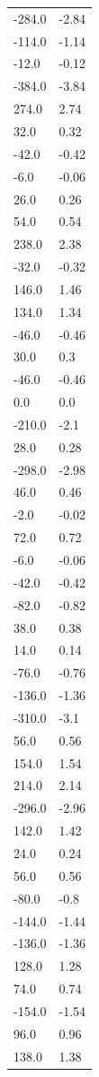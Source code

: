 \begin{longtable}{ll}
-284.0 & -2.84 \\
-114.0 & -1.14 \\
-12.0 & -0.12 \\
-384.0 & -3.84 \\
274.0 & 2.74 \\
32.0 & 0.32 \\
-42.0 & -0.42 \\
-6.0 & -0.06 \\
26.0 & 0.26 \\
54.0 & 0.54 \\
238.0 & 2.38 \\
-32.0 & -0.32 \\
146.0 & 1.46 \\
134.0 & 1.34 \\
-46.0 & -0.46 \\
30.0 & 0.3 \\
-46.0 & -0.46 \\
0.0 & 0.0 \\
-210.0 & -2.1 \\
28.0 & 0.28 \\
-298.0 & -2.98 \\
46.0 & 0.46 \\
-2.0 & -0.02 \\
72.0 & 0.72 \\
-6.0 & -0.06 \\
-42.0 & -0.42 \\
-82.0 & -0.82 \\
38.0 & 0.38 \\
14.0 & 0.14 \\
-76.0 & -0.76 \\
-136.0 & -1.36 \\
-310.0 & -3.1 \\
56.0 & 0.56 \\
154.0 & 1.54 \\
214.0 & 2.14 \\
-296.0 & -2.96 \\
142.0 & 1.42 \\
24.0 & 0.24 \\
56.0 & 0.56 \\
-80.0 & -0.8 \\
-144.0 & -1.44 \\
-136.0 & -1.36 \\
128.0 & 1.28 \\
74.0 & 0.74 \\
-154.0 & -1.54 \\
96.0 & 0.96 \\
138.0 & 1.38 \\

\end{longtable}
